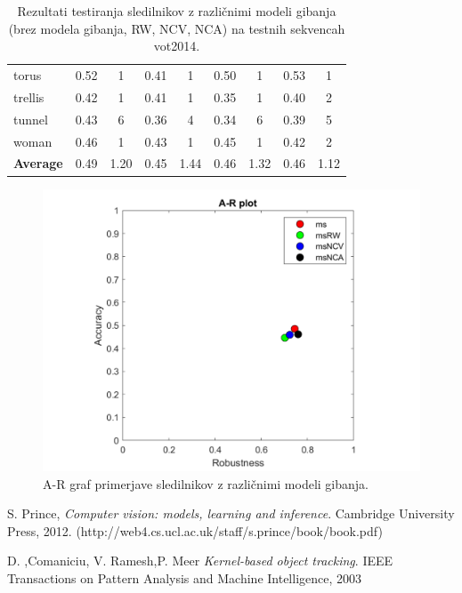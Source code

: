 \documentclass[a4paper]{article}
\begin{document}
\begin{table}[h]
\begin{center}
\begin{tabular}{l c c c c c c c c}
			torus & 0.52 & 1 & 0.41 & 1 & 0.50 & 1 & 0.53 & 1\\
			trellis & 0.42 & 1 & 0.41 & 1 & 0.35 & 1 & 0.40 & 2\\
			tunnel & 0.43 & 6 & 0.36 & 4 & 0.34 & 6 & 0.39 & 5\\
			woman & 0.46 & 1 & 0.43 & 1 & 0.45 & 1 & 0.42 & 2\\
			\hline 
			{\bf Average} & 0.49 & 1.20 & 0.45 & 1.44 & 0.46 & 1.32 & 0.46 & 1.12\\
			\hline 
			\end{tabular}
	\end{center}
	\caption{Rezultati testiranja sledilnikov z različnimi modeli gibanja (brez modela gibanja, RW, NCV, NCA) na testnih sekvencah vot2014.}
	\label{tabela}
\end{table}
\begin{figure}[h]
	\begin{center}
		\includegraphics [width=1\textwidth] {ar.pdf}
	\end{center}
	\caption{A-R graf primerjave sledilnikov z različnimi modeli gibanja. }
	\label{ar}
\end{figure} 


\small
\begin{thebibliography}{1}

S. Prince,
\textit{Computer vision: models, learning and inference}. 
Cambridge University Press, 2012. (http://web4.cs.ucl.ac.uk/staff/s.prince/book/book.pdf)

D. ,Comaniciu, V. Ramesh,P. Meer  
\textit{Kernel-based object tracking}.
IEEE Transactions on Pattern Analysis and Machine Intelligence, 2003

\end{thebibliography}
\end{document}
